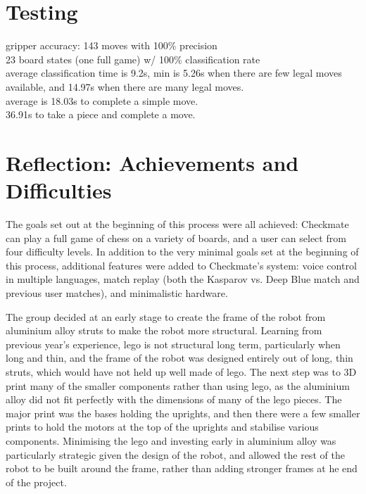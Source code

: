 \documentclass[onecolumn]{IEEEtran}
\begin{document}
\section{Testing}
gripper accuracy: 143 moves with 100\% precision\\
23 board states (one full game) w/ 100\% classification rate\\
average classification time is 9.2s, min is 5.26s when there are few legal moves available, and 14.97s when there are many legal moves. \\
average is 18.03s to complete a simple move.\\
36.91s to take a piece and complete a move.\\



\section{Reflection: Achievements and Difficulties}
The goals set out at the beginning of this process were all achieved: Checkmate can play a full game of chess on a variety of boards, and a user can select from four difficulty levels. In addition to the very minimal goals set at the beginning of this process, additional features were added to Checkmate's system: voice control in multiple languages, match replay (both the Kasparov vs. Deep Blue match and previous user matches), and minimalistic hardware. \par
The group decided at an early stage to create the frame of the robot from aluminium alloy struts to make the robot more structural. Learning from previous year's experience, lego is not structural long term, particularly when long and thin, and the frame of the robot was designed entirely out of long, thin struts, which would have not held up well made of lego. The next step was to 3D print many of the smaller components rather than using lego, as the aluminium alloy did not fit perfectly with the dimensions of many of the lego pieces. The major print was the bases holding the uprights, and then there were a few smaller prints to hold the motors at the top of the uprights and stabilise various components. Minimising the lego and investing early in aluminium alloy was particularly strategic given the design of the robot, and allowed the rest of the robot to be built around the frame, rather than adding stronger frames at he end of the project. \par
\end{document}
